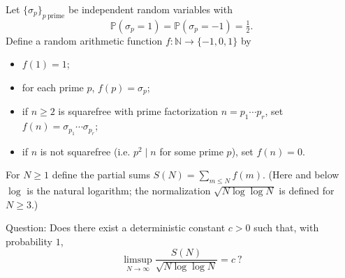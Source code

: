 Let $\{\sigma_p\}_{p\ \text{prime}}$ be independent random variables with
\[\mathbb P(\sigma_p=1)=\mathbb P(\sigma_p=-1)=\tfrac12.\]
Define a random arithmetic function $f:\mathbb N\to\{-1,0,1\}$ by
\begin{itemize}
\item $f(1)=1$;
\item for each prime $p$, $f(p)=\sigma_p$;
\item if $n\ge 2$ is squarefree with prime factorization $n=p_1\cdots p_r$, set $f(n)=\sigma_{p_1}\cdots \sigma_{p_r}$;
\item if $n$ is not squarefree (i.e. $p^2\mid n$ for some prime $p$), set $f(n)=0$.
\end{itemize}
For $N\ge 1$ define the partial sums $S(N)=\sum_{m\le N} f(m)$. (Here and below $\log$ is the natural logarithm; the normalization $\sqrt{N\log\log N}$ is defined for $N\ge 3$.)

Question: Does there exist a deterministic constant $c>0$ such that, with probability $1$,
\[\limsup_{N\to\infty}\frac{S(N)}{\sqrt{N\log\log N}}=c\ ?\]
